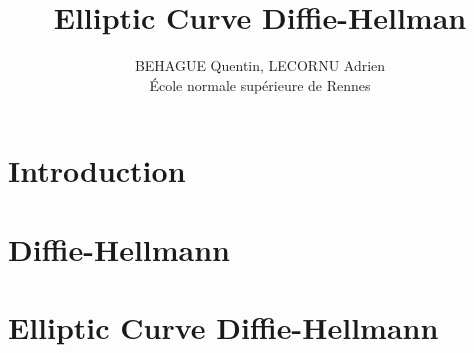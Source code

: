 \documentclass{article}
\title{Elliptic Curve Diffie-Hellman}
\author{BEHAGUE Quentin, LECORNU Adrien \\École normale supérieure de Rennes}
\date{}
\begin{document}
\maketitle
\newpage
\tableofcontents
\hypersetup{linkcolor=gray}
\newpage
\section{Introduction}

\section{Diffie-Hellmann}

\section{Elliptic Curve Diffie-Hellmann}
\end{document}
